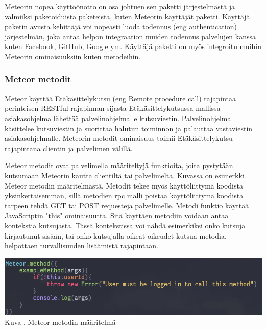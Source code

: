 Meteorin nopea käyttöönotto on osa johtuen sen paketti järjestelmästä ja valmiiksi paketoiduista paketeista, kuten Meteorin käyttäjät paketti. 
Käyttäjä paketin avusta kehittäjä voi nopeasti luoda todennus (eng authentication) järjestelmän,
joka antaa helpon integraation muiden todennus palvelujen kanssa kuten Facebook, GitHub, Google ym.
Käyttäjä paketti on myös integroitu muihin Meteorin ominaisuuksiin kuten metodeihin. 



\subsubsection{Meteor metodit}




Meteor käyttää Etäkäsittelykutsu (eng Remote procedure call) rajapintaa perinteisen RESTful rajapinnan sijasta 
Etäkäsittelykutsussa mallissa asiakasohjelma lähettää palvelinohjelmalle kutsuviestin.
Palvelinohjelma käsittelee kutsuviestin ja suorittaa halutun toiminnon ja palauttaa vastaviestin asiakasohjelmalle.
Meteorin metodit ominaisuus toimii Etäkäsittelykutsu rajapintana clientin ja palvelimen välillä. 
\medskip



Meteor metodit ovat palvelimella määriteltyjä funktioita, joita pystytään kutsumaan Meteorin kautta clientiltä tai palvelimelta. 
Kuvassa \nextImageCount{} on esimerkki Meteor metodin määritelmästä.
Metodit tekee myös käyttöliittymä koodista yksinkertaisemman, 
sillä metodien rpc malli poistaa käyttöliittymä koodista tarpeen tehdä GET tai POST requesteja palvelimelle.
Metodi funktio käyttää JavaScriptin "this"{} ominaisuutta. 
Sitä käyttäen metodiin voidaan antaa kontekstia kutsujasta.
Tässä kontekstissa voi nähdä esimerkiksi onko kutsuja kirjautunut sisään, tai onko kutsujalla oikeat oikeudet kutsua metodia, 
helpottaen turvallisuuden lisäämistä rajapintaan.
\bigskip

\includegraphics[width=15cm]{src/public/methodexample.png}\\
Kuva \getImgCount {}. Meteor metodin määritelmä
\medskip

